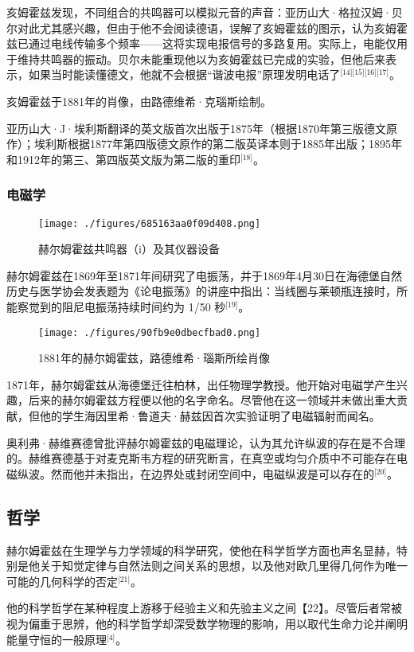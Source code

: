亥姆霍兹发现，不同组合的共鸣器可以模拟元音的声音：亚历山大·格拉汉姆·贝尔对此尤其感兴趣，但由于他不会阅读德语，误解了亥姆霍兹的图示，认为亥姆霍兹已通过电线传输多个频率——这将实现电报信号的多路复用。实际上，电能仅用于维持共鸣器的振动。贝尔未能重现他以为亥姆霍兹已完成的实验，但他后来表示，如果当时能读懂德文，他就不会根据“谐波电报”原理发明电话了\(^\text{[14][15][16][17]}\)。

亥姆霍兹于1881年的肖像，由路德维希·克瑙斯绘制。

亚历山大·J·埃利斯翻译的英文版首次出版于1875年（根据1870年第三版德文原作）；埃利斯根据1877年第四版德文原作的第二版英译本则于1885年出版；1895年和1912年的第三、第四版英文版为第二版的重印\(^\text{[18]}\)。
\subsubsection{电磁学}
\begin{figure}[ht]
\centering
\texttt{[image: ./figures/685163aa0f09d408.png]}
\caption{赫尔姆霍兹共鸣器（i）及其仪器设备} \label{fig_HEMfhm_5}
\end{figure}
赫尔姆霍兹在1869年至1871年间研究了电振荡，并于1869年4月30日在海德堡自然历史与医学协会发表题为《论电振荡》的讲座中指出：当线圈与莱顿瓶连接时，所能察觉到的阻尼电振荡持续时间约为 1/50 秒\(^\text{[19]}\)。
\begin{figure}[ht]
\centering
\texttt{[image: ./figures/90fb9e0dbecfbad0.png]}
\caption{1881年的赫尔姆霍兹，路德维希·瑙斯所绘肖像} \label{fig_HEMfhm_6}
\end{figure}
1871年，赫尔姆霍兹从海德堡迁往柏林，出任物理学教授。他开始对电磁学产生兴趣，后来的赫尔姆霍兹方程便以他的名字命名。尽管他在这一领域并未做出重大贡献，但他的学生海因里希·鲁道夫·赫兹因首次实验证明了电磁辐射而闻名。

奥利弗·赫维赛德曾批评赫尔姆霍兹的电磁理论，认为其允许纵波的存在是不合理的。赫维赛德基于对麦克斯韦方程的研究断言，在真空或均匀介质中不可能存在电磁纵波。然而他并未指出，在边界处或封闭空间中，电磁纵波是可以存在的\(^\text{[20]}\)。
\subsection{哲学}
赫尔姆霍兹在生理学与力学领域的科学研究，使他在科学哲学方面也声名显赫，特别是他关于知觉定律与自然法则之间关系的思想，以及他对欧几里得几何作为唯一可能的几何科学的否定\(^\text{[21]}\)。

他的科学哲学在某种程度上游移于经验主义和先验主义之间【22】。尽管后者常被视为偏重于思辨，他的科学哲学却深受数学物理的影响，用以取代生命力论并阐明能量守恒的一般原理\(^\text{[4]}\)。

